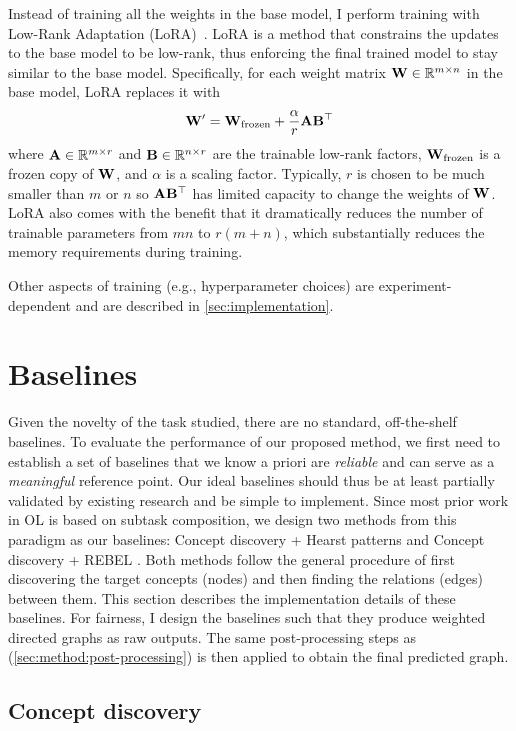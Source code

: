 Instead of training all the weights in the base model, I perform training with Low-Rank Adaptation (LoRA)~\cite{hu2021lora}. LoRA is a method that constrains the updates to the base model to be low-rank, thus enforcing the final trained model to stay similar to the base model. Specifically, for each weight matrix $\mathbf{W} \in \mathbb{R}^{m \times n}$ in the base model, LoRA replaces it with
\[
    \mathbf{W}' = \mathbf{W}_{\text{frozen}} + \frac{\alpha}{r} \mathbf{A} \mathbf{B}^\top
\]
where $\mathbf{A} \in \mathbb{R}^{m \times r}$ and $\mathbf{B} \in \mathbb{R}^{n \times r}$ are the trainable low-rank factors, $\mathbf{W}_{\text{frozen}}$ is a frozen copy of $\mathbf{W}$, and $\alpha$ is a scaling factor. Typically, $r$ is chosen to be much smaller than $m$ or $n$ so $\mathbf{A}\mathbf{B}^\top$ has limited capacity to change the weights of $\mathbf{W}$. LoRA also comes with the benefit that it dramatically reduces the number of trainable parameters from $mn$ to $r(m + n)$, which substantially reduces the memory requirements during training.

Other aspects of training (e.g., hyperparameter choices) are experiment-dependent and are described in \cref{sec:implementation}.

\section{Baselines}  \label{sec:implementation:baselines}

Given the novelty of the task studied, there are no standard, off-the-shelf baselines. To evaluate the performance of our proposed method, we first need to establish a set of baselines that we know a priori are \emph{reliable} and can serve as a \emph{meaningful} reference point. Our ideal baselines should thus be at least partially validated by existing research and be simple to implement. Since most prior work in OL is based on subtask composition, we design two methods from this paradigm as our baselines: Concept discovery + Hearst patterns \cite{hearst1998automated} and Concept discovery + REBEL \cite{cabot2021rebel}. Both methods follow the general procedure of first discovering the target concepts (nodes) and then finding the relations (edges) between them. This section describes the implementation details of these baselines. For fairness, I design the baselines such that they produce weighted directed graphs as raw outputs. The same post-processing steps as \name (\cref{sec:method:post-processing}) is then applied to obtain the final predicted graph.

\subsection{Concept discovery}

